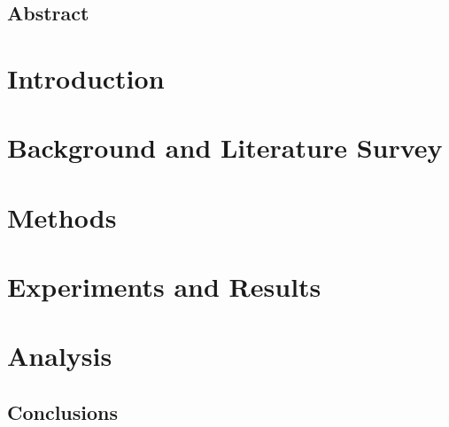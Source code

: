 \documentclass[12pt, letterpaper]{report}
\begin{document}



\tableofcontents
\newpage


\section*{Abstract}


\newpage
\chapter{Introduction}


\newpage
\chapter{Background and Literature Survey}


\newpage
\chapter{Methods}


\newpage
\chapter{Experiments and Results}


\newpage
\chapter{Analysis}


\newpage
\section{Conclusions}


\newpage
{}


\end{document}
